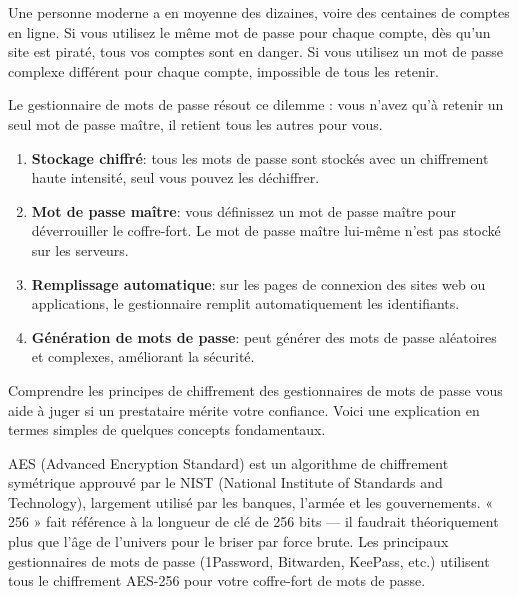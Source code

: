 


Une personne moderne a en moyenne des dizaines, voire des centaines de comptes en ligne. Si vous utilisez le même mot de passe pour chaque compte, dès qu'un site est piraté, tous vos comptes sont en danger. Si vous utilisez un mot de passe complexe différent pour chaque compte, impossible de tous les retenir.

Le gestionnaire de mots de passe résout ce dilemme : vous n'avez qu'à retenir un seul mot de passe maître, il retient tous les autres pour vous.


\begin{enumerate}
  \item \textbf{Stockage chiffré}: tous les mots de passe sont stockés avec un chiffrement haute intensité, seul vous pouvez les déchiffrer.
  \item \textbf{Mot de passe maître}: vous définissez un mot de passe maître pour déverrouiller le coffre-fort. Le mot de passe maître lui-même n'est pas stocké sur les serveurs.
  \item \textbf{Remplissage automatique}: sur les pages de connexion des sites web ou applications, le gestionnaire remplit automatiquement les identifiants.
  \item \textbf{Génération de mots de passe}: peut générer des mots de passe aléatoires et complexes, améliorant la sécurité.
\end{enumerate}


Comprendre les principes de chiffrement des gestionnaires de mots de passe vous aide à juger si un prestataire mérite votre confiance. Voici une explication en termes simples de quelques concepts fondamentaux.


AES (Advanced Encryption Standard) est un algorithme de chiffrement symétrique approuvé par le NIST (National Institute of Standards and Technology), largement utilisé par les banques, l'armée et les gouvernements. « 256 » fait référence à la longueur de clé de 256 bits — il faudrait théoriquement plus que l'âge de l'univers pour le briser par force brute. Les principaux gestionnaires de mots de passe (1Password, Bitwarden, KeePass, etc.) utilisent tous le chiffrement AES-256 pour votre coffre-fort de mots de passe.

